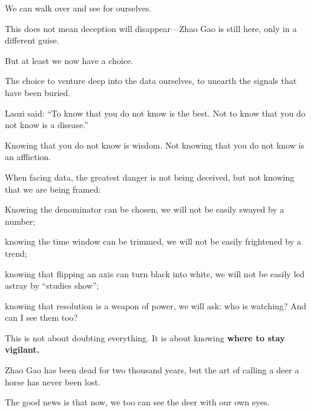 We can walk over and see for ourselves.

This does not mean deception will disappear---Zhao Gao is still here, only in a different guise.

But at least we now have a choice.

The choice to venture deep into the data ourselves, to unearth the signals that have been buried.

\vspace{1em}

Laozi said: ``To know that you do not know is the best. Not to know that you do not know is a disease.''

Knowing that you do not know is wisdom. Not knowing that you do not know is an affliction.

When facing data, the greatest danger is not being deceived, but not knowing that we are being framed:

Knowing the denominator can be chosen, we will not be easily swayed by a number;

knowing the time window can be trimmed, we will not be easily frightened by a trend;

knowing that flipping an axis can turn black into white, we will not be easily led astray by ``studies show'';

knowing that resolution is a weapon of power, we will ask: who is watching? And can I see them too?

\vspace{1em}

This is not about doubting everything. It is about knowing \textbf{where to stay vigilant.}

\vspace{1em}

Zhao Gao has been dead for two thousand years, but the art of calling a deer a horse has never been lost.

The good news is that now, we too can see the deer with our own eyes.
